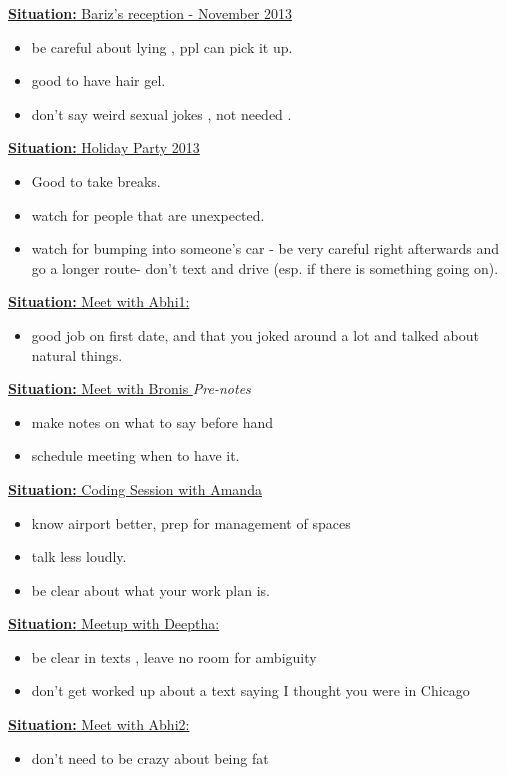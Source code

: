 \documentclass[11pt]{article}
\newcommand{\newSituation}[1]{\underline{\textbf{Situation:} #1} }
\begin{document}
\newSituation{Bariz’s reception - November  2013} 
\begin{itemize} 
\item be careful about lying , ppl can pick it up. 
\item good to have hair gel. 
\item don't say weird sexual jokes , not needed .
\end{itemize}

\newSituation{Holiday Party 2013}
\begin{itemize}
\item Good to take breaks. 
\item watch for people that are unexpected. 
\item watch for bumping into someone's car - be very careful right afterwards and go a longer route- don't text and drive (esp. if there is something going on). 
\end{itemize} 

\newSituation{Meet with Abhi1:}
\begin{itemize} 
\item good job on first date, and that you joked around a lot and talked about natural things. 
\end{itemize} 

\newSituation{Meet with Bronis }
\textit{Pre-notes}
\begin{itemize}
\item make notes on what to say before hand
\item schedule meeting when to have it.
\end{itemize}

\newSituation{Coding Session with Amanda}
\begin{itemize}
\item know airport better, prep for management of spaces 
\item talk less loudly. 
\item be clear about what your work plan is. 
\end{itemize} 

\newSituation{Meetup with Deeptha:} 
\begin{itemize} 
\item be clear in texts , leave no room for ambiguity
\item don’t get worked up about a text saying I thought you were in Chicago
\end{itemize} 

\newSituation{Meet with Abhi2:}
\begin{itemize} 
\item don't need to be crazy about being fat
\end{itemize} 
\end{document}
